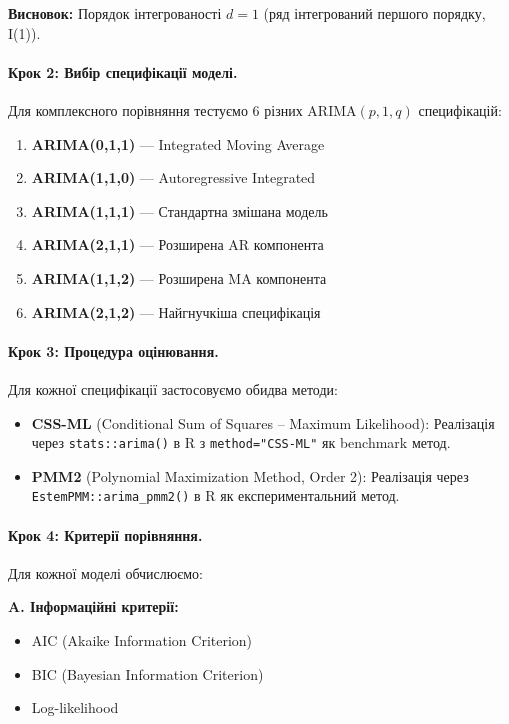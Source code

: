 \documentclass[12pt,a4paper]{article}
\begin{document}
\noindent\textbf{Висновок:} Порядок інтегрованості $d=1$ (ряд інтегрований першого порядку, I(1)).

\paragraph{Крок 2: Вибір специфікації моделі.}
Для комплексного порівняння тестуємо 6 різних ARIMA$(p,1,q)$ специфікацій:

\begin{enumerate}
    \item \textbf{ARIMA(0,1,1)} --- Integrated Moving Average
    \item \textbf{ARIMA(1,1,0)} --- Autoregressive Integrated
    \item \textbf{ARIMA(1,1,1)} --- Стандартна змішана модель
    \item \textbf{ARIMA(2,1,1)} --- Розширена AR компонента
    \item \textbf{ARIMA(1,1,2)} --- Розширена MA компонента
    \item \textbf{ARIMA(2,1,2)} --- Найгнучкіша специфікація
\end{enumerate}

\paragraph{Крок 3: Процедура оцінювання.}
Для кожної специфікації застосовуємо обидва методи:

\begin{itemize}
    \item \textbf{CSS-ML} (Conditional Sum of Squares -- Maximum Likelihood): Реалізація через \texttt{stats::arima()} в R з \texttt{method="CSS-ML"} як benchmark метод.

    \item \textbf{PMM2} (Polynomial Maximization Method, Order 2): Реалізація через \texttt{EstemPMM::arima\_pmm2()} в R як експериментальний метод.
\end{itemize}

\paragraph{Крок 4: Критерії порівняння.}
Для кожної моделі обчислюємо:

\textbf{A. Інформаційні критерії:}
\begin{itemize}
    \item AIC (Akaike Information Criterion)
    \item BIC (Bayesian Information Criterion)
    \item Log-likelihood
\end{itemize}
\end{document}
